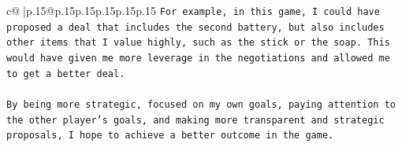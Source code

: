 \documentclass{article}
\begin{document}
{\begin{supertabular}{c@{$\;$}|p{.15\linewidth}@{}p{.15\linewidth}p{.15\linewidth}p{.15\linewidth}p{.15\linewidth}p{.15\linewidth}}
{{{\texttt{For example, in this game, I could have proposed a deal that includes the second battery, but also includes other items that I value highly, such as the stick or the soap. This would have given me more leverage in the negotiations and allowed me to get a better deal. } \\
\\ 
\texttt{By being more strategic, focused on my own goals, paying attention to the other player's goals, and making more transparent and strategic proposals, I hope to achieve a better outcome in the game.} \\
            }
        }
    }
     \\ \\

\end{supertabular}
}
\end{document}
